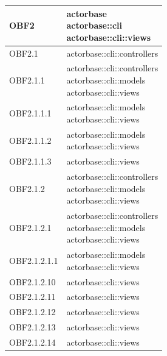 \documentclass{scalatekids-article}
\begin{document}
\begin{longtable}[H]{|p{3.5cm}|p{7.5cm}|}
\hline
OBF2 & \multiLineCell[t]{actorbase\\actorbase::cli\\actorbase::cli::views\\}\\
\hline
OBF2.1 & \multiLineCell[t]{actorbase::cli::controllers\\}\\
\hline
OBF2.1.1 & \multiLineCell[t]{actorbase::cli::controllers\\actorbase::cli::models\\actorbase::cli::views\\}\\
\hline
OBF2.1.1.1 & \multiLineCell[t]{actorbase::cli::models\\actorbase::cli::views\\}\\
\hline
OBF2.1.1.2 & \multiLineCell[t]{actorbase::cli::models\\actorbase::cli::views\\}\\
\hline
OBF2.1.1.3 & \multiLineCell[t]{actorbase::cli::views\\}\\
\hline
OBF2.1.2 & \multiLineCell[t]{actorbase::cli::controllers\\actorbase::cli::models\\actorbase::cli::views\\}\\
\hline
OBF2.1.2.1 & \multiLineCell[t]{actorbase::cli::controllers\\actorbase::cli::models\\actorbase::cli::views\\}\\
\hline
OBF2.1.2.1.1 & \multiLineCell[t]{actorbase::cli::models\\actorbase::cli::views\\}\\
\hline
OBF2.1.2.10 & \multiLineCell[t]{actorbase::cli::views\\}\\
\hline
OBF2.1.2.11 & \multiLineCell[t]{actorbase::cli::views\\}\\
\hline
OBF2.1.2.12 & \multiLineCell[t]{actorbase::cli::views\\}\\
\hline
OBF2.1.2.13 & \multiLineCell[t]{actorbase::cli::views\\}\\
\hline
OBF2.1.2.14 & \multiLineCell[t]{actorbase::cli::views\\}\\

\end{longtable}
\end{document}
